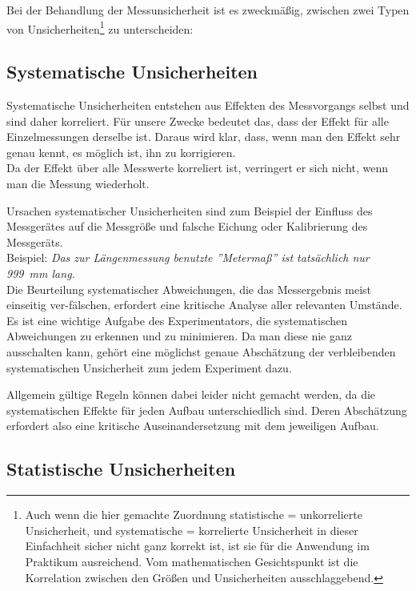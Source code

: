 Bei der Behandlung der Messunsicherheit ist es zweckmäßig, zwischen zwei Typen von Unsicherheiten\footnote{Auch wenn die hier gemachte Zuordnung statistische = unkorrelierte Unsicherheit, und systematische = korrelierte Unsicherheit in dieser Einfachheit sicher nicht ganz korrekt ist, ist sie für die Anwendung im Praktikum ausreichend. Vom mathematischen Gesichtspunkt ist die Korrelation zwischen den Größen und Unsicherheiten ausschlaggebend.} zu unterscheiden:
\subsection{Systematische Unsicherheiten}

Systematische Unsicherheiten entstehen aus Effekten des Messvorgangs selbst und sind daher korreliert. Für unsere Zwecke bedeutet das, dass der Effekt für alle Einzelmessungen derselbe ist. Daraus wird klar, dass, wenn man den Effekt sehr genau kennt, es möglich ist, ihn zu korrigieren.\\
Da der Effekt über alle Messwerte korreliert ist, verringert er sich nicht, wenn man die Messung wiederholt.

Ursachen systematischer Unsicherheiten sind zum Beispiel der Einfluss des Messgerätes auf die Messgröße und falsche Eichung oder Kalibrierung des Messgeräts.\\

Beispiel: \textit{Das zur Längenmessung benutzte ''Metermaß'' ist tatsächlich nur 999~mm lang.}\\

Die Beurteilung systematischer Abweichungen, die das Messergebnis meist einseitig ver-fälschen, erfordert eine kritische Analyse aller relevanten Umstände. Es ist eine wichtige Aufgabe des Experimentators, die systematischen Abweichungen zu erkennen und zu minimieren. Da man diese nie ganz ausschalten kann, gehört eine möglichst genaue Abschätzung der verbleibenden systematischen Unsicherheit zum jedem Experiment dazu.

Allgemein gültige Regeln können dabei leider nicht gemacht werden, da die systematischen Effekte für jeden Aufbau unterschiedlich sind. Deren Abschätzung erfordert also eine kritische Auseinandersetzung mit dem jeweiligen Aufbau.
\subsection{Statistische Unsicherheiten}


